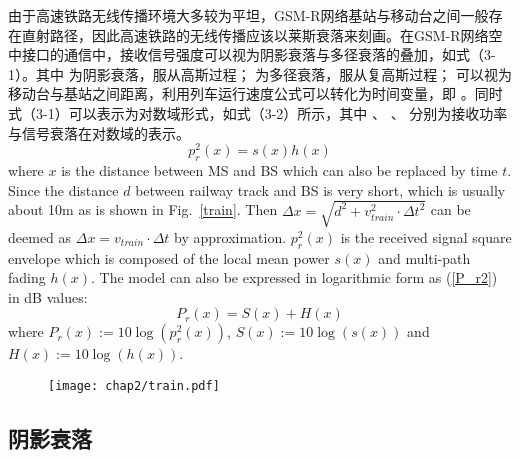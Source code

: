 由于高速铁路无线传播环境大多较为平坦，GSM-R网络基站与移动台之间一般存在直射路径，因此高速铁路的无线传播应该以莱斯衰落来刻画。在GSM-R网络空中接口的通信中，接收信号强度可以视为阴影衰落与多径衰落的叠加，如式（3-1）。其中 为阴影衰落，服从高斯过程； 为多径衰落，服从复高斯过程； 可以视为移动台与基站之间距离，利用列车运行速度公式可以转化为时间变量，即 。同时式（3-1）可以表示为对数域形式，如式（3-2）所示，其中 、 、 分别为接收功率与信号衰落在对数域的表示。
\begin{equation}
    p_{r}^{2}(x) = s(x)h(x)
\label{p_r1}
\end{equation}
where $x$ is the distance between MS and BS which can also be replaced by time $t$. Since the distance $d$ between railway track and BS is very short, which is usually about 10m as is shown in Fig.~\ref{train}. Then $\Delta x=\sqrt{d^2+v_{train}^2\cdot \Delta t^2}$ can be deemed as $\Delta x=v_{train}\cdot \Delta t$ by approximation. $p_{r}^{2}(x)$ is the received signal square envelope which is composed of the local mean power $s(x)$ and multi-path fading $h(x)$. The model can also be expressed in logarithmic form as (\ref{P_r2}) in dB values:
\begin{equation}
P_{r}(x) = S(x) + H(x)
\label{P_r2}
\end{equation}
where $P_r(x):=10\log(p_{r}^{2}(x))$, $S(x):=10\log(s(x))$ and $H(x):=10\log(h(x))$.

\begin{figure}[!htp]
\centering
    \texttt{[image: chap2/train.pdf]}
\end{figure}

\subsection{阴影衰落}
\label{sec:shadow}

